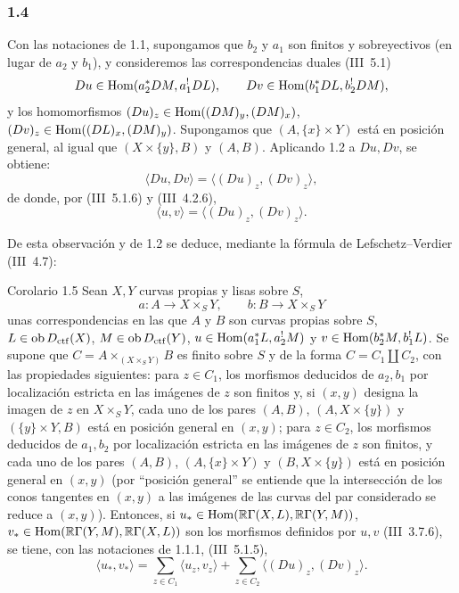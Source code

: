 \subsubsection*{1.4}
Con las notaciones de 1.1, supongamos que $b_2$ y $a_1$ son finitos y sobreyectivos (en lugar de $a_2$ y $b_1$), y consideremos las correspondencias duales (III~5.1)
\[
Du\in\operatorname{Hom}(a_2^*DM,a_1^!DL),\qquad Dv\in\operatorname{Hom}(b_1^*DL,b_2^!DM),
\]
y los homomorfismos $(Du)_z\in\operatorname{Hom}((DM)_y,(DM)_x)$, $(Dv)_z\in\operatorname{Hom}((DL)_x,(DM)_y)$. Supongamos que $(A,\{x\}\times Y)$ está en posición general, al igual que $(X\times\{y\},B)$ y $(A,B)$. Aplicando 1.2 a $Du,Dv$, se obtiene:
\[
\langle Du,Dv\rangle=\langle (Du)_z,(Dv)_z\rangle,
\]
de donde, por (III~5.1.6) y (III~4.2.6),
\begin{equation}\tag{1.4.1}
\langle u,v\rangle=\langle (Du)_z,(Dv)_z\rangle.
\end{equation}

De esta observación y de 1.2 se deduce, mediante la fórmula de Lefschetz--Verdier (III~4.7):

\begin{statement}{Corolario 1.5}
Sean $X,Y$ curvas propias y lisas sobre $S$,
\[
a:A\longrightarrow X\times_S Y,
\qquad
b:B\longrightarrow X\times_S Y
\]
unas correspondencias en las que $A$ y $B$ son curvas propias sobre $S$, $L\in\operatorname{ob} D_{\mathrm{ctf}}(X)$, $M\in\operatorname{ob} D_{\mathrm{ctf}}(Y)$, $u\in\operatorname{Hom}(a_1^*L,a_2^!M)$ y $v\in\operatorname{Hom}(b_2^*M,b_1^!L)$. Se supone que $C=A\times_{(X\times_S Y)}B$ es finito sobre $S$ y de la forma $C=C_1\amalg C_2$, con las propiedades siguientes: para $z\in C_1$, los morfismos deducidos de $a_2,b_1$ por localización estricta en las imágenes de $z$ son finitos y, si $(x,y)$ designa la imagen de $z$ en $X\times_S Y$, cada uno de los pares $(A,B)$, $(A,X\times\{y\})$ y $(\{y\}\times Y,B)$ está en posición general en $(x,y)$; para $z\in C_2$, los morfismos deducidos de $a_1,b_2$ por localización estricta en las imágenes de $z$ son finitos, y cada uno de los pares $(A,B)$, $(A,\{x\}\times Y)$ y $(B,X\times\{y\})$ está en posición general en $(x,y)$ (por ``posición general'' se entiende que la intersección de los conos tangentes en $(x,y)$ a las imágenes de las curvas del par considerado se reduce a $(x,y)$). Entonces, si $u_*\in\operatorname{Hom}(\mathbb{R}\Gamma(X,L),\mathbb{R}\Gamma(Y,M))$, $v_*\in\operatorname{Hom}(\mathbb{R}\Gamma(Y,M),\mathbb{R}\Gamma(X,L))$ son los morfismos definidos por $u,v$ (III~3.7.6), se tiene, con las notaciones de 1.1.1, (III~5.1.5),
\begin{equation}\tag{1.5.1}
\langle u_*,v_*\rangle=\sum_{z\in C_1}\langle u_z,v_z\rangle+\sum_{z\in C_2}\langle (Du)_z,(Dv)_z\rangle.
\end{equation}
\end{statement}

